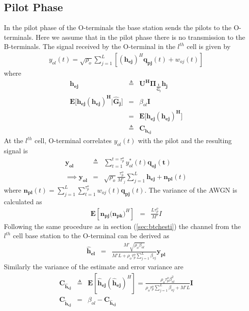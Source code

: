 \documentclass[10pt, a4paper, twoside,fleqn]{article}
\begin{document}
\subsection{Pilot Phase}
	In the pilot phase of the O-terminals the base station sends the pilots to the O-terminals. Here we assume that in the pilot phase there is no transmission to the B-terminals.
The signal received by the O-terminal in the $l^{th}$ cell is given by
\begin{eqnarray}
	y_{ol}(t)=\sqrt{\rho_o} \sum_{j=1}^{L} \left[(\pmb{h_{ej}})^H \pmb{q_{pj}}(t) + w_{oj}(t) \right]
\end{eqnarray}
where
\begin{eqnarray}
	\pmb{h_{ej}} &\triangleq& \pmb{U^H\Pi_{\frac{1}{\hat G_j}}h_j} \nonumber \\
        \pmb{E[h_{ej}(h_{ej})^H|\hat G_j}] &=& \beta_{ol}\pmb{I} \nonumber \\
			                     &=& \pmb{E[h_{ej}(h_{ej})^H}] \nonumber \\
                                           &\triangleq& \pmb{C_{h_{ej}}} \nonumber
\end{eqnarray}
At the $l^{th}$ cell, O-terminal correlates $y_{ol}(t)$ with the pilot and the resulting signal is
\begin{eqnarray}
	\pmb{y_{ol}} &\triangleq& \sum_{t=1}^{t=\tau_p^o} y_{ol}^*(t)\pmb{q_{oj}(t)} \nonumber \\
\implies \pmb{y_{ol}} &=& \sqrt{\rho_o}\frac{\tau_p^o}{M'_j}\sum_{j=1}^{L}\pmb{h_{ej}}+\pmb{n_{pl}}(t)
\end{eqnarray}
where $\pmb{n_{pl}}(t) = \sum_{j=1}^{L} \sum_{t=1}^{\tau_p^o} w_{oj}(t) \pmb{q_{pj}}(t)$. The variance of the AWGN is calculated as
\begin{eqnarray*}
	\pmb{E}[\pmb{n_{pj}(n_{pk}})^H] &=& \frac{L\tau_p^o}{M'}I 
\end{eqnarray*}
Following the same procedure as in section (\ref{sec:btchesti}) the channel from the $l^{th}$ cell base station to the O-terminal can be derived as 
\begin{eqnarray}\label{eqn:otchesti}
	\pmb{\hat h_{el}} &=& \frac{M'\sqrt{\rho_o\beta_{ol}}}{M'L+\rho_o\tau_p^o\sum_{j=1}^{L}\beta_{oj}}\pmb{y_{pl}}
\end{eqnarray}
Similarly the variance of the estimate and error variance are
\begin{eqnarray}
	\pmb{C_{\hat h_{ej}}} &\triangleq& \pmb{E}[\pmb{\hat h_{ej}}(\pmb{\hat h_{ej}})^H] = \frac{\rho_o\tau_p^o\beta^2_{ol}}{\rho_o\tau_p^o\sum_{j=1}^{L}\beta_{oj}+M'L}\pmb{I} \\
	\pmb{C_{\widetilde{h}_{ej}}} &=& \beta_{ol} - \pmb{C_{\hat h_{ej}}} 
\end{eqnarray}
\end{document}
